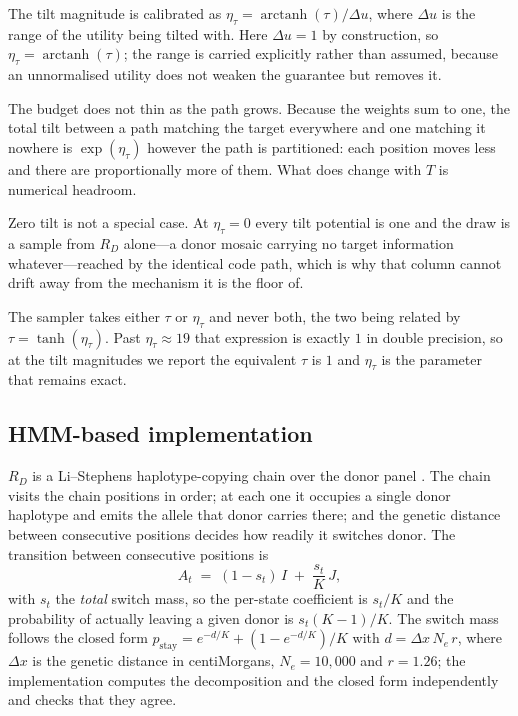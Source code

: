 The tilt magnitude is calibrated as $\eta_\tau = \operatorname{arctanh}(\tau)/\Delta
u$, where $\Delta u$ is the range of the utility being tilted with. Here $\Delta u =
1$ by construction, so $\eta_\tau = \operatorname{arctanh}(\tau)$; the range is
carried explicitly rather than assumed, because an unnormalised utility does not
weaken the guarantee but removes it.

The budget does not thin as the path grows. Because the weights sum to one, the total
tilt between a path matching the target everywhere and one matching it nowhere is
$\exp(\eta_\tau)$ however the path is partitioned: each position moves less and there
are proportionally more of them. What does change with $T$ is numerical headroom.

Zero tilt is not a special case. At $\eta_\tau = 0$ every tilt potential is one and
the draw is a sample from $R_D$ alone---a donor mosaic carrying no target information
whatever---reached by the identical code path, which is why that column cannot drift
away from the mechanism it is the floor of.

The sampler takes either $\tau$ or $\eta_\tau$ and never both, the two being related
by $\tau = \tanh(\eta_\tau)$. Past $\eta_\tau \approx 19$ that expression is exactly
$1$ in double precision, so at the tilt magnitudes we report the equivalent $\tau$ is
$1$ and $\eta_\tau$ is the parameter that remains exact.

\subsection{HMM-based implementation}

$R_D$ is a Li--Stephens haplotype-copying chain over the donor panel
\cite{li2003}. The chain visits the chain positions in order; at each one it occupies
a single donor haplotype and emits the allele that donor carries there; and the
genetic distance between consecutive positions decides how readily it switches donor.
The transition between consecutive positions is
\begin{equation}
A_t \;=\; (1 - s_t)\,I \;+\; \frac{s_t}{K}\,J,
\end{equation}
with $s_t$ the \emph{total} switch mass, so the per-state coefficient is $s_t/K$ and
the probability of actually leaving a given donor is $s_t(K-1)/K$. The switch mass
follows the closed form $p_{\mathrm{stay}} = e^{-d/K} + (1 - e^{-d/K})/K$ with
$d = \Delta x\, N_e\, r$, where $\Delta x$ is the genetic distance in centiMorgans,
$N_e = 10{,}000$ and $r = 1.26$; the implementation computes the decomposition and
the closed form independently and checks that they agree.

